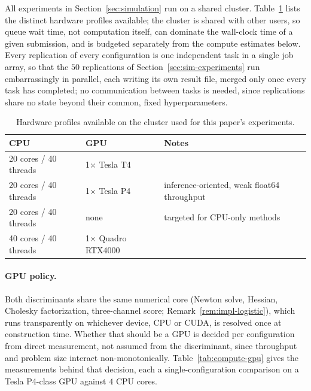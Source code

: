 \documentclass[11pt]{article}
\theoremstyle{plain}
\theoremstyle{definition}
\theoremstyle{remark}
\begin{document}
All experiments in Section~\ref{sec:simulation} run on a shared cluster.
Table~\ref{tab:compute-nodes} lists the distinct hardware profiles available; the cluster is
shared with other users, so queue wait time, not computation itself, can dominate the
wall-clock time of a given submission, and is budgeted separately from the compute estimates
below. Every replication of every configuration is one independent task in a single job array,
so that the $50$ replications of Section~\ref{sec:sim-experiments} run embarrassingly in
parallel, each writing its own result file, merged only once every task has completed; no
communication between tasks is needed, since replications share no state beyond their common,
fixed hyperparameters.

\begin{table}[htbp]
\centering
\begin{tabular}{@{}lll@{}}
\toprule
CPU & GPU & Notes \\
\midrule
20 cores / 40 threads & 1$\times$ Tesla T4 & \\
20 cores / 40 threads & 1$\times$ Tesla P4 & inference-oriented, weak float64 throughput \\
20 cores / 40 threads & none & targeted for CPU-only methods \\
40 cores / 40 threads & 1$\times$ Quadro RTX4000 & \\
\bottomrule
\end{tabular}
\caption{Hardware profiles available on the cluster used for this paper's experiments.}
\label{tab:compute-nodes}
\end{table}

\paragraph{GPU policy.} Both discriminants share the same numerical core
(Newton solve, Hessian, Cholesky factorization, three-channel score;
Remark~\ref{rem:impl-logistic}), which runs transparently on whichever device, CPU or CUDA,
is resolved once at construction time. Whether that should be a GPU is decided per
configuration from direct measurement, not assumed from the discriminant, since throughput and
problem size interact non-monotonically. Table~\ref{tab:compute-gpu} gives the measurements
behind that decision, each a single-configuration comparison on a Tesla P4-class GPU against
$4$ CPU cores.
\end{document}
